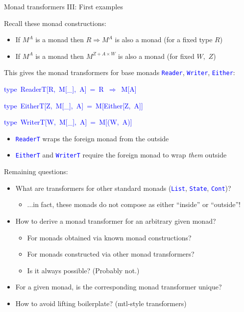 \documentclass[english]{beamer}
\newenvironment{lyxcode}
  {\par\begin{list}{}{
    \setlength{\rightmargin}{\leftmargin}
    \setlength{\listparindent}{0pt}%
    \raggedright
    \setlength{\itemsep}{0pt}
    \setlength{\parsep}{0pt}
    \normalfont\ttfamily}%
   \def\{{\char`\{}
   \def\}{\char`\}}
   \def\textasciitilde{\char`\~}
   \item[]}
  {\end{list}}
\begin{document}
\begin{frame}{Monad transformers III: First examples}

{\footnotesize{}\vspace{-0.2cm}}Recall these monad constructions:
\begin{itemize}
\item If $M^{A}$ is a monad then $R\Rightarrow M^{A}$ is also a monad
(for a fixed type $R$)
\item If $M^{A}$ is a monad then $M^{Z+A\times W}$ is also a monad (for
fixed $W,$ $Z$)
\end{itemize}
This gives the monad transformers for base monads \texttt{\textcolor{blue}{\footnotesize{}Reader}},
\texttt{\textcolor{blue}{\footnotesize{}Writer}}, \texttt{\textcolor{blue}{\footnotesize{}Either}}:
\begin{lyxcode}
\textcolor{blue}{\footnotesize{}type~ReaderT{[}R,~M{[}\_{]},~A{]}~=~R~$\Rightarrow$~M{[}A{]}}{\footnotesize\par}

\textcolor{blue}{\footnotesize{}type~EitherT{[}Z,~M{[}\_{]},~A{]}~=~M{[}Either{[}Z,~A{]}{]}}{\footnotesize\par}

\textcolor{blue}{\footnotesize{}type~WriterT{[}W,~M{[}\_{]},~A{]}~=~M{[}(W,~A){]}}{\footnotesize\par}
\end{lyxcode}
\begin{itemize}
\item {\footnotesize{}\vspace{-0.2cm}}\texttt{\textcolor{blue}{\footnotesize{}ReaderT}}
wraps the foreign monad from the outside
\item \texttt{\textcolor{blue}{\footnotesize{}EitherT}} and \texttt{\textcolor{blue}{\footnotesize{}WriterT}}
require the foreign monad to wrap \emph{them} outside
\end{itemize}
Remaining questions:
\begin{itemize}
\item What are transformers for other standard monads (\texttt{\textcolor{blue}{\footnotesize{}List}},
\texttt{\textcolor{blue}{\footnotesize{}State}}, \texttt{\textcolor{blue}{\footnotesize{}Cont}})?
\begin{itemize}
\item ...in fact, these monads do not compose as either ``inside'' or
``outside''!
\end{itemize}
\item How to derive a monad transformer for an arbitrary given monad?
\begin{itemize}
\item For monads obtained via known monad constructions?
\item For monads constructed via other monad transformers?
\item Is it always possible? (Probably not.)
\end{itemize}
\item For a given monad, is the corresponding monad transformer unique?
\item How to avoid lifting boilerplate? (mtl-style transformers)
\end{itemize}
\end{frame}
\end{document}
